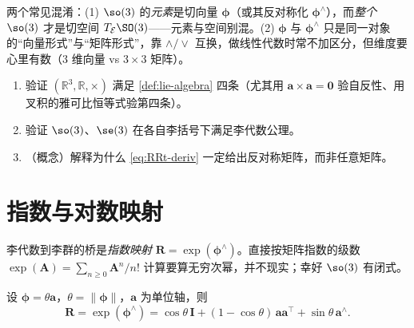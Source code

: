 \begin{pitfall}
两个常见混淆：(1) $\so(3)$ 的\emph{元素}是切向量 $\boldsymbol{\phi}$（或其反对称化 $\boldsymbol{\phi}^\wedge$），而\emph{整个} $\so(3)$ 才是切空间 $T_{\mathcal{E}}\SO(3)$——元素与空间别混。(2) $\boldsymbol{\phi}$ 与 $\boldsymbol{\phi}^\wedge$ 只是同一对象的“向量形式”与“矩阵形式”，靠 $\wedge/\vee$ 互换，做线性代数时常不加区分，但维度要心里有数（$3$ 维向量 vs $3\times3$ 矩阵）。
\end{pitfall}

\begin{practice}
\begin{enumerate}
  \item 验证 $(\mathbb{R}^3,\mathbb{R},\times)$ 满足 \cref{def:lie-algebra} 四条（尤其用 $\mathbf{a}\times\mathbf{a}=\mathbf{0}$ 验自反性、用叉积的雅可比恒等式验第四条）。
  \item 验证 $\so(3)$、$\se(3)$ 在各自李括号下满足李代数公理。
  \item （概念）解释为什么 \cref{eq:RRt-deriv} 一定给出反对称矩阵，而非任意矩阵。
\end{enumerate}
\end{practice}

\section{指数与对数映射}
\label{sec:exp-log}

李代数到李群的桥是\emph{指数映射} $\mathbf{R}=\exp(\boldsymbol{\phi}^\wedge)$。直接按矩阵指数的级数 $\exp(\mathbf{A})=\sum_{n\ge0}\mathbf{A}^n/n!$ 计算要算无穷次幂，并不现实；幸好 $\so(3)$ 有闭式。

\begin{theorem}\label{thm:so3-exp}
设 $\boldsymbol{\phi}=\theta\mathbf{a}$，$\theta=\|\boldsymbol{\phi}\|$，$\mathbf{a}$ 为单位轴，则
\begin{equation}
  \mathbf{R}=\exp(\boldsymbol{\phi}^\wedge)=\cos\theta\,\mathbf{I}+(1-\cos\theta)\,\mathbf{a}\mathbf{a}^\top+\sin\theta\,\mathbf{a}^\wedge.
  \label{eq:rodrigues}
\end{equation}
\end{theorem}

